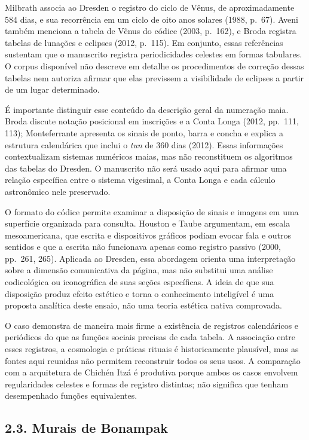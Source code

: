 \documentclass[
  brazilian,
]{article}
\begin{document}
Milbrath associa ao Dresden o registro do ciclo de Vênus, de
aproximadamente 584 dias, e sua recorrência em um ciclo de oito anos
solares (1988, p.~67). Aveni também menciona a tabela de Vênus do códice
(2003, p.~162), e Broda registra tabelas de lunações e eclipses (2012,
p.~115). Em conjunto, essas referências sustentam que o manuscrito
registra periodicidades celestes em formas tabulares. O corpus
disponível não descreve em detalhe os procedimentos de correção dessas
tabelas nem autoriza afirmar que elas previssem a visibilidade de
eclipses a partir de um lugar determinado.

É importante distinguir esse conteúdo da descrição geral da numeração
maia. Broda discute notação posicional em inscrições e a Conta Longa
(2012, pp.~111, 113); Monteferrante apresenta os sinais de ponto, barra
e concha e explica a estrutura calendárica que inclui o \emph{tun} de
360 dias (2012). Essas informações contextualizam sistemas numéricos
maias, mas não reconstituem os algoritmos das tabelas do Dresden. O
manuscrito não será usado aqui para afirmar uma relação específica entre
o sistema vigesimal, a Conta Longa e cada cálculo astronômico nele
preservado.

O formato do códice permite examinar a disposição de sinais e imagens em
uma superfície organizada para consulta. Houston e Taube argumentam, em
escala mesoamericana, que escrita e dispositivos gráficos podiam evocar
fala e outros sentidos e que a escrita não funcionava apenas como
registro passivo (2000, pp.~261, 265). Aplicada ao Dresden, essa
abordagem orienta uma interpretação sobre a dimensão comunicativa da
página, mas não substitui uma análise codicológica ou iconográfica de
suas seções específicas. A ideia de que sua disposição produz efeito
estético e torna o conhecimento inteligível é uma proposta analítica
deste ensaio, não uma teoria estética nativa comprovada.

O caso demonstra de maneira mais firme a existência de registros
calendáricos e periódicos do que as funções sociais precisas de cada
tabela. A associação entre esses registros, a cosmologia e práticas
rituais é historicamente plausível, mas as fontes aqui reunidas não
permitem reconstruir todos os seus usos. A comparação com a arquitetura
de Chichén Itzá é produtiva porque ambos os casos envolvem regularidades
celestes e formas de registro distintas; não significa que tenham
desempenhado funções equivalentes.

\subsection{2.3. Murais de Bonampak}\label{murais-de-bonampak}
\end{document}
